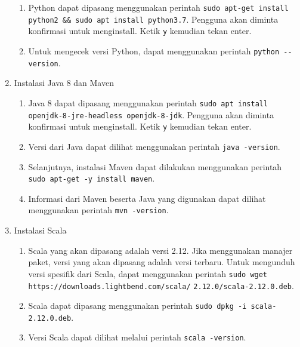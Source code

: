 \begin{enumerate}
  \begin{enumerate}
    \item Python dapat dipasang menggunakan perintah \verb|sudo apt-get install python2 && sudo apt install python3.7|. Pengguna akan diminta konfirmasi untuk menginstall. Ketik \verb|y| kemudian tekan enter.
    \item Untuk mengecek versi Python, dapat menggunakan perintah \verb|python --version|.
  \end{enumerate}
  \item Instalasi Java 8 dan Maven
  \begin{enumerate}
    \item Java 8 dapat dipasang menggunakan perintah \verb|sudo apt install openjdk-8-jre-headless openjdk-8-jdk|. Pengguna akan diminta konfirmasi untuk menginstall. Ketik \verb|y| kemudian tekan enter.
    \item Versi dari Java dapat dilihat menggunakan perintah \verb|java -version|.
    \item Selanjutnya, instalasi Maven dapat dilakukan menggunakan perintah \verb| sudo apt-get -y install maven|.
    \item Informasi dari Maven beserta Java yang digunakan dapat dilihat menggunakan perintah \verb|mvn -version|.
  \end{enumerate}
  \item Instalasi Scala
  \begin{enumerate}
    \item Scala yang akan dipasang adalah versi 2.12. Jika menggunakan manajer paket, versi yang akan dipasang adalah versi terbaru. Untuk mengunduh versi spesifik dari Scala, dapat menggunakan perintah \verb|sudo wget  https://downloads.lightbend.com/scala/| \verb|2.12.0/scala-2.12.0.deb|.
    \item Scala dapat dipasang menggunakan perintah \verb|sudo dpkg -i scala-2.12.0.deb|.
    \item Versi Scala dapat dilihat melalui perintah \verb|scala -version|.
  \end{enumerate}
\end{enumerate}
